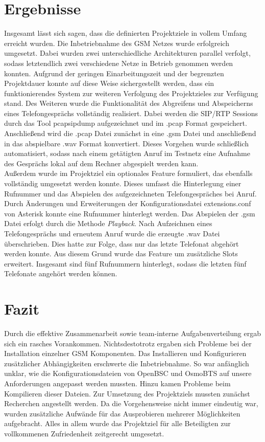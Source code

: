 \section{Ergebnisse} 
Insgesamt lässt sich sagen, dass die definierten Projektziele in vollem Umfang erreicht wurden. Die Inbetriebnahme des GSM Netzes wurde erfolgreich umgesetzt. Dabei wurden zwei unterschiedliche Architekturen parallel verfolgt, sodass letztendlich zwei verschiedene Netze in Betrieb genommen werden konnten. Aufgrund der geringen Einarbeitungszeit und der begrenzten Projektdauer konnte auf diese Weise sichergestellt werden, dass ein funktionierendes System zur weiteren Verfolgung des Projektzieles zur Verfügung stand. Des Weiteren wurde die Funktionalität des Abgreifens und Abspeicherns eines Telefongesprächs vollständig realisiert. Dabei werden die SIP/RTP Sessions durch das Tool pcapsipdump aufgezeichnet und im .pcap Format gespeichert. Anschließend wird die .pcap Datei zunächst in eine .gsm Datei und anschließend in das abspielbare .wav Format konvertiert. Dieses Vorgehen wurde schließlich automatisiert, sodass nach einem getätigten Anruf im Testnetz eine Aufnahme des Gesprächs lokal auf dem Rechner abgespielt werden kann.\\

Außerdem wurde im Projektziel ein optionales Feature formuliert, das ebenfalls vollständig umgesetzt werden konnte. Dieses umfasst die Hinterlegung einer Rufnummer und das Abspielen des aufgezeichneten Telefongespräches bei Anruf. Durch Änderungen und Erweiterungen der Konfigurationsdatei extensions.conf von Asterisk konnte eine Rufnummer hinterlegt werden. Das Abspielen der .gsm Datei erfolgt durch die Methode \textit{Playback}. Nach Aufzeichnen eines Telefongesprächs und erneutem Anruf wurde die erzeugte .wav Datei überschrieben. Dies hatte zur Folge, dass nur das letzte Telefonat abgehört werden konnte. Aus diesem Grund wurde das Feature um zusätzliche Slots erweitert. Insgesamt sind fünf Rufnummern hinterlegt, sodass die letzten fünf Telefonate angehört werden können. 

\section{Fazit}
Durch die effektive Zusammenarbeit sowie team-interne Aufgabenverteilung ergab sich ein rasches Vorankommen. Nichtsdestotrotz ergaben sich Probleme bei der Installation einzelner GSM Komponenten. Das Installieren und Konfigurieren zusätzlicher Abhängigkeiten erschwerte die Inbetriebnahme. So war anfänglich unklar, wie die Konfigurationsdateien von OpenBSC und OsmoBTS auf unsere Anforderungen angepasst werden mussten. Hinzu kamen Probleme beim Kompilieren dieser Dateien. Zur Umsetzung des Projektziels mussten zunächst Recherchen angestellt werden. Da die Vorgehensweise nicht immer eindeutig war, wurden zusätzliche Aufwände für das Ausprobieren mehrerer Möglichkeiten aufgebracht. Alles in allem wurde das Projektziel für alle Beteiligten zur vollkommenen Zufriedenheit zeitgerecht umgesetzt.


